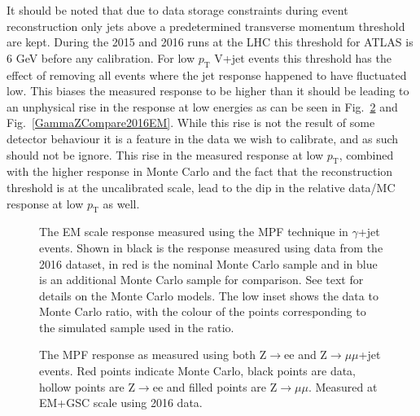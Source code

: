 It should be noted that due to data storage constraints during event reconstruction only jets above a predetermined transverse momentum threshold are kept.  
During the 2015 and 2016 runs at the LHC this threshold for ATLAS is 6 GeV before any calibration.  
For low $p_{\mathrm T}$ V+jet events this threshold has the effect of removing all events where the jet response happened to have fluctuated low.  
This biases the measured response to be higher than it should be leading to an unphysical rise in the response at low energies as can be seen in Fig.~\ref{eemumuCompare2016EM} and Fig.~\ref{GammaZCompare2016EM}.  
While this rise is not the result of some detector behaviour it is a feature in the data we wish to calibrate, and as such should not be ignore.  
This rise in the measured response at low $p_{\mathrm T}$, combined with the higher response in Monte Carlo and the fact that the reconstruction threshold is at the uncalibrated scale, lead to the dip in the relative data/MC response at low $p_{\mathrm T}$ as well.  


\begin{figure}[!ht]
 \begin{center}
 \end{center}
 \caption[EM scale response using $\gamma$+jet in 2016]
 {\small The EM scale response measured using the MPF technique in $\gamma$+jet events.  Shown in black is the response measured using data from the 2016 dataset, in red is the nominal Monte Carlo sample and in blue is an additional Monte Carlo sample for comparison.  See text for details on the Monte Carlo models.  The low inset shows the data to Monte Carlo ratio, with the colour of the points corresponding to the simulated sample used in the ratio.  }
 \label{Fig:GammaJetEM2016}
\end{figure}


\begin{figure}[!ht]
\begin{center}
\end{center}
\caption[Comparing EM scale response between Z$\rightarrow$ee and Z$\rightarrow\mu\mu$]
{\small The MPF response as measured using both Z$\rightarrow$ee and Z$\rightarrow\mu\mu$+jet events.  Red points indicate Monte Carlo, black points are data, hollow points are Z$\rightarrow$ee and filled points are Z$\rightarrow\mu\mu$.  Measured at EM+GSC scale using 2016 data.  }
\label{eemumuCompare2016EM}
\end{figure}

